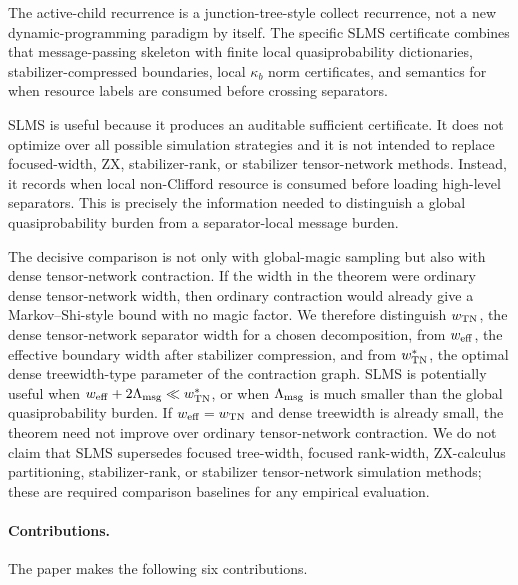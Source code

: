 The active-child recurrence is a junction-tree-style collect recurrence, not a new dynamic-programming paradigm by itself. The specific SLMS certificate combines that message-passing skeleton with finite local quasiprobability dictionaries, stabilizer-compressed boundaries, local \(\kappa_b\) norm certificates, and semantics for when resource labels are consumed before crossing separators.

SLMS is useful because it produces an auditable sufficient certificate. It does not optimize over all possible simulation strategies and it is not intended to replace focused-width, ZX, stabilizer-rank, or stabilizer tensor-network methods. Instead, it records when local non-Clifford resource is consumed before loading high-level separators. This is precisely the information needed to distinguish a global quasiprobability burden from a separator-local message burden.

The decisive comparison is not only with global-magic sampling but also with dense tensor-network contraction. If the width in the theorem were ordinary dense tensor-network width, then ordinary contraction would already give a Markov--Shi-style bound with no magic factor. We therefore distinguish \(w_{\mathrm{TN}}\), the dense tensor-network separator width for a chosen decomposition, from \(w_{\mathrm{eff}}\), the effective boundary width after stabilizer compression, and from \(w_{\mathrm{TN}}^\ast\), the optimal dense treewidth-type parameter of the contraction graph. SLMS is potentially useful when \(w_{\mathrm{eff}}+2\Lambda_{\mathrm{msg}}\ll w_{\mathrm{TN}}^\ast\), or when \(\Lambda_{\mathrm{msg}}\) is much smaller than the global quasiprobability burden. If \(w_{\mathrm{eff}}=w_{\mathrm{TN}}\) and dense treewidth is already small, the theorem need not improve over ordinary tensor-network contraction. We do not claim that SLMS supersedes focused tree-width, focused rank-width, ZX-calculus partitioning, stabilizer-rank, or stabilizer tensor-network simulation methods; these are required comparison baselines for any empirical evaluation.

\paragraph{Contributions.}
The paper makes the following six contributions.

